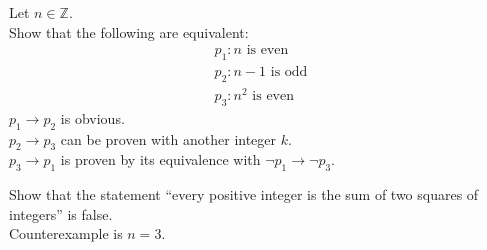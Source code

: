 \documentclass[a4paper, 12pt]{article}
\newenvironment{example}[1][Example]{\begin{trivlist}
\item[\hskip \labelsep {\bfseries #1}]}{\end{trivlist}}
\newcommand{\then}{\rightarrow}
\begin{document}
    \begin{example}
        Let $n \in \mathbb{Z}$. \\
        Show that the following are equivalent:
        \begin{align*}
            p_1: \text{$n$ is even} \\
            p_2: \text{$n - 1$ is odd} \\
            p_3: \text{$n^2$ is even}
        \end{align*}
        $p_1 \then p_2$ is obvious. \\
        $p_2 \then p_3$ can be proven with another integer $k$. \\
        $p_3 \then p_1$ is proven by its equivalence with $\neg p_1 \then \neg p_3$.
    \end{example}
    \begin{example}
        Show that the statement ``every positive integer is the sum of two squares of integers''
        is false. \\ Counterexample is $n = 3$.
    \end{example}
\end{document}

